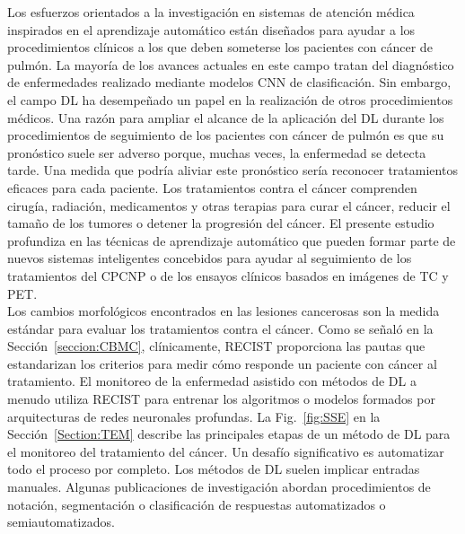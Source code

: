 \documentclass[11pt,a4paper,openany]{article}
\begin{document}
        Los esfuerzos orientados a la investigación en sistemas de atención médica inspirados en el aprendizaje automático están diseñados para ayudar a los procedimientos clínicos a los que deben someterse los pacientes con cáncer de pulmón. La mayoría de los avances actuales en este campo tratan del diagnóstico de enfermedades realizado mediante modelos CNN de clasificación. Sin embargo, el campo DL ha desempeñado un papel en la realización de otros procedimientos médicos. Una razón para ampliar el alcance de la aplicación del DL durante los procedimientos de seguimiento de los pacientes con cáncer de pulmón es que su pronóstico suele ser adverso porque, muchas veces, la enfermedad se detecta tarde. Una medida que podría aliviar este pronóstico sería reconocer tratamientos eficaces para cada paciente. Los tratamientos contra el cáncer comprenden cirugía, radiación, medicamentos y otras terapias para curar el cáncer, reducir el tamaño de los tumores o detener la progresión del cáncer. El presente estudio profundiza en las técnicas de aprendizaje automático que pueden formar parte de nuevos sistemas inteligentes concebidos para ayudar al seguimiento de los tratamientos del CPCNP o de los ensayos clínicos basados en imágenes de TC y PET.\\

        Los cambios morfológicos encontrados en las lesiones cancerosas son la medida estándar para evaluar los tratamientos contra el cáncer. Como se señaló en la Sección~\ref{seccion:CBMC}, clínicamente, RECIST proporciona las pautas que estandarizan los criterios para medir cómo responde un paciente con cáncer al tratamiento. El monitoreo de la enfermedad asistido con métodos de DL a menudo utiliza RECIST para entrenar los algoritmos o modelos formados por arquitecturas de redes neuronales profundas. La Fig.~\ref{fig:SSE} en la Sección~\ref{Section:TEM} describe las principales etapas de un método de DL para el monitoreo del tratamiento del cáncer. Un desafío significativo es automatizar todo el proceso por completo. Los métodos de DL suelen implicar entradas manuales. Algunas publicaciones de investigación abordan procedimientos de notación, segmentación o clasificación de respuestas automatizados o semiautomatizados. \\
\end{document}
